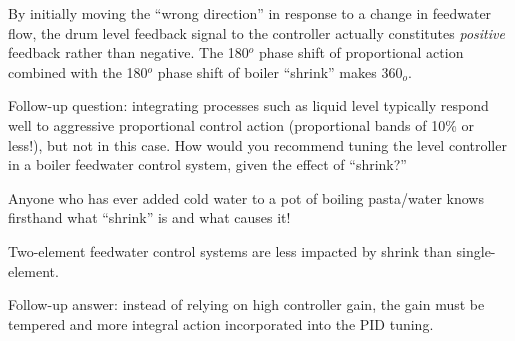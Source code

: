 
By initially moving the ``wrong direction'' in response to a change in feedwater flow, the drum level feedback signal to the controller actually constitutes {\it positive} feedback rather than negative.  The 180$^{o}$ phase shift of proportional action combined with the 180$^{o}$ phase shift of boiler ``shrink'' makes 360$_{o}$.

\vskip 10pt

Follow-up question: integrating processes such as liquid level typically respond well to aggressive proportional control action (proportional bands of 10\% or less!), but not in this case.  How would you recommend tuning the level controller in a boiler feedwater control system, given the effect of ``shrink?''







Anyone who has ever added cold water to a pot of boiling pasta/water knows firsthand what ``shrink'' is and what causes it!

\vskip 10pt

Two-element feedwater control systems are less impacted by shrink than single-element.

\vskip 10pt

Follow-up answer: instead of relying on high controller gain, the gain must be tempered and more integral action incorporated into the PID tuning.




